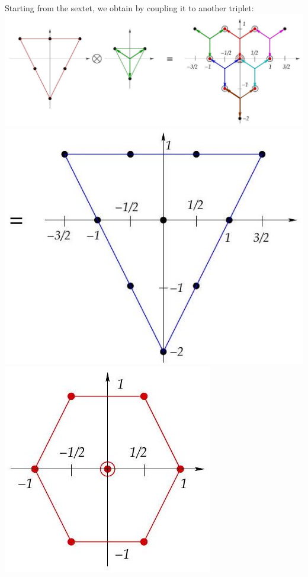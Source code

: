 \documentclass[10pt, letterpaper]{article}
\begin{document}
Starting from the sextet, we obtain by coupling it to another triplet:\\
\includegraphics[scale=0.3, center]{2025_05_20_8618f55a41bfe980b4b2g-55(1)}\\
\includegraphics[scale=0.3, center]{2025_05_20_8618f55a41bfe980b4b2g-55(3)}\\
\includegraphics[scale=0.3, center]{2025_05_20_8618f55a41bfe980b4b2g-55}
\end{document}
